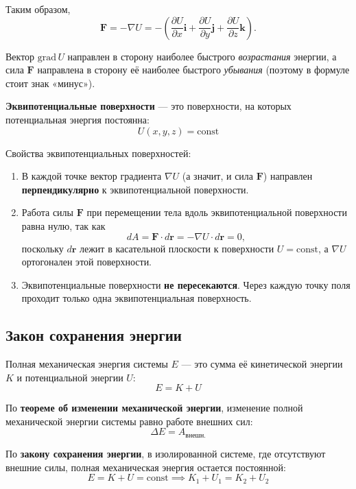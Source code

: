Таким образом,
\[
\mathbf{F} = -\nabla U = -\left( \frac{\partial U}{\partial x}\mathbf{i} + \frac{\partial U}{\partial y}\mathbf{j} + \frac{\partial U}{\partial z}\mathbf{k} \right).
\]

Вектор $\text{grad}\, U$ направлен в сторону наиболее быстрого \textit{возрастания} энергии, а сила $\mathbf{F}$ направлена в сторону её наиболее быстрого \textit{убывания} (поэтому в формуле стоит знак «минус»).

\textbf{Эквипотенциальные поверхности} — это поверхности, на которых потенциальная энергия постоянна:
\[
U(x, y, z) = \text{const}
\]

Свойства эквипотенциальных поверхностей:
\begin{enumerate}
    \item В каждой точке вектор градиента $\nabla U$ (а значит, и сила $\mathbf{F}$) направлен \textbf{перпендикулярно} к эквипотенциальной поверхности.
    
    \item Работа силы $\mathbf{F}$ при перемещении тела вдоль эквипотенциальной поверхности равна нулю, так как
    \[
    dA = \mathbf{F} \cdot d\mathbf{r} = -\nabla U \cdot d\mathbf{r} = 0,
    \]
    поскольку $d\mathbf{r}$ лежит в касательной плоскости к поверхности $U=\text{const}$, а $\nabla U$ ортогонален этой поверхности.
    
    \item Эквипотенциальные поверхности \textbf{не пересекаются}. Через каждую точку поля проходит только одна эквипотенциальная поверхность.
\end{enumerate}

\subsection{Закон сохранения энергии}
Полная механическая энергия системы $E$ — это сумма её кинетической энергии $K$ и потенциальной энергии $U$:
\[
E = K + U
\]

По \textbf{теореме об изменении механической энергии}, изменение полной механической энергии системы равно работе внешних сил:
\[
\Delta E = A_{\text{внешн.}}
\]

По \textbf{закону сохранения энергии}, в изолированной системе, где отсутствуют внешние силы, полная механическая энергия остается постоянной:
\[
E = K + U = \text{const} \implies K_1 + U_1 = K_2 + U_2
\]